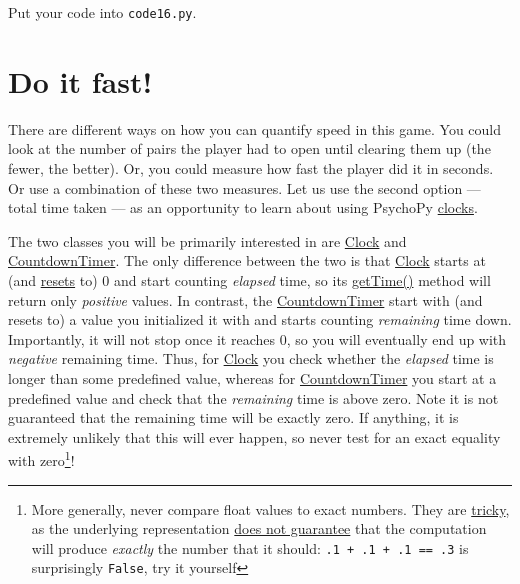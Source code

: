 \documentclass[
]{book}
\begin{document}
Put your code into \texttt{code16.py}.

\hypertarget{do-it-fast}{%
\section{Do it fast!}\label{do-it-fast}}

There are different ways on how you can quantify speed in this game. You could look at the number of pairs the player had to open until clearing them up (the fewer, the better). Or, you could measure how fast the player did it in seconds. Or use a combination of these two measures. Let us use the second option --- total time taken --- as an opportunity to learn about using PsychoPy \href{https://psychopy.org/api/clock.html}{clocks}.

The two classes you will be primarily interested in are \href{https://psychopy.org/api/clock.html\#psychopy.clock.Clock}{Clock} and \href{https://psychopy.org/api/clock.html\#psychopy.clock.CountdownTimer}{CountdownTimer}. The only difference between the two is that \href{https://psychopy.org/api/clock.html\#psychopy.clock.Clock}{Clock} starts at (and \href{https://psychopy.org/api/clock.html\#psychopy.clock.Clock.reset}{resets} to) 0 and start counting \emph{elapsed} time, so its \href{https://psychopy.org/api/clock.html\#psychopy.clock.MonotonicClock.getTime}{getTime()} method will return only \emph{positive} values. In contrast, the \href{https://psychopy.org/api/clock.html\#psychopy.clock.CountdownTimer}{CountdownTimer} start with (and resets to) a value you initialized it with and starts counting \emph{remaining} time down. Importantly, it will not stop once it reaches 0, so you will eventually end up with \emph{negative} remaining time. Thus, for \href{https://psychopy.org/api/clock.html\#psychopy.clock.Clock}{Clock} you check whether the \emph{elapsed} time is longer than some predefined value, whereas for \href{https://psychopy.org/api/clock.html\#psychopy.clock.CountdownTimer}{CountdownTimer} you start at a predefined value and check that the \emph{remaining} time is above zero. Note it is not guaranteed that the remaining time will be exactly zero. If anything, it is extremely unlikely that this will ever happen, so never test for an exact equality with zero\footnote{More generally, never compare float values to exact numbers. They are \href{http://www.lahey.com/float.htm}{tricky}, as the underlying representation \href{https://docs.python.org/3/tutorial/floatingpoint.html}{does not guarantee} that the computation will produce \emph{exactly} the number that it should: \texttt{.1\ +\ .1\ +\ .1\ ==\ .3} is surprisingly \texttt{False}, try it yourself}!
\end{document}
